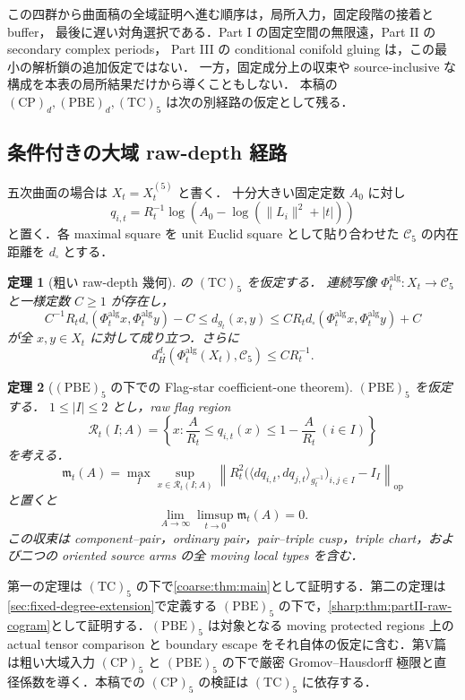 \documentclass[a4paper,11pt]{ltjsarticle}
\numberwithin{equation}{section}
\theoremstyle{plain}
\newtheorem{theorem}{定理}[section]
\theoremstyle{definition}
\theoremstyle{remark}
\newcommand{\Cfive}{\mathcal C_5}\newcommand{\dsq}{d_{\square}}\newcommand{\Lt}{L_t}\newcommand{\Rt}{R_t}
\begin{document}
この四群から曲面稿の全域証明へ進む順序は，局所入力，固定段階の接着と buffer，
最後に遅い対角選択である．Part I の固定空間の無限遠，Part II の secondary complex periods，
Part III の conditional conifold gluing は，この最小の解析鎖の追加仮定ではない．
一方，固定成分上の収束や source-inclusive な構成を本表の局所結果だけから導くこともしない．
本稿の $\mathrm{(CP)}_d,\mathrm{(PBE)}_d,\mathrm{(TC)}_5$ は次の別経路の仮定として残る．

\subsection{条件付きの大域 raw-depth 経路}
五次曲面の場合は $X_t=X_t^{(5)}$ と書く．
十分大きい固定定数 $A_0$ に対し
\[
 q_{i,t}=R_t^{-1}\log\!\left(A_0-\log(\|L_i\|^2+|t|)\right)
\]
と置く．各 maximal square を unit Euclid square として貼り合わせた $\Cfive$ の内在距離を $d_\square$ とする．

\begin{theorem}[粗い raw-depth 幾何]\label{thm:coarse-intro}
 の $\mathrm{(TC)}_5$ を仮定する．
連続写像 $\Phi_t^{\mathrm{alg}}:X_t\to\Cfive$ と一様定数 $C\ge1$ が存在し，
\[
 C^{-1}R_t d_\square(\Phi_t^{\mathrm{alg}}x,\Phi_t^{\mathrm{alg}}y)-C
 \le d_{g_t}(x,y)
 \le CR_t d_\square(\Phi_t^{\mathrm{alg}}x,\Phi_t^{\mathrm{alg}}y)+C
\]
が全 $x,y\in X_t$ に対して成り立つ．さらに
\[
 d_H^{d_\square}(\Phi_t^{\mathrm{alg}}(X_t),\Cfive)\le CR_t^{-1}.
\]
\end{theorem}

\begin{theorem}[$\mathrm{(PBE)}_5$ の下での Flag-star coefficient-one theorem]\label{thm:cogram-intro}
$\mathrm{(PBE)}_5$ を仮定する．
$1\le |I|\le2$ とし，raw flag region
\[
 \mathcal R_t(I;A)=\left\{x:\frac A{R_t}\le q_{i,t}(x)\le1-\frac A{R_t}\ (i\in I)\right\}
\]
を考える．
\[
 \mathfrak m_t(A)=
 \max_I\sup_{x\in\mathcal R_t(I;A)}
 \left\|
 R_t^2\bigl(\langle dq_{i,t},dq_{j,t}\rangle_{g_t^{-1}}\bigr)_{i,j\in I}-I_I
 \right\|_{\mathrm{op}}
\]
と置くと
\[
 \lim_{A\to\infty}\limsup_{t\to0}\mathfrak m_t(A)=0.
\]
この収束は component--pair，ordinary pair，pair--triple cusp，triple chart，および二つの oriented source arms の全 moving local types を含む．
\end{theorem}

第一の定理は $\mathrm{(TC)}_5$ の下で\cref{coarse:thm:main}として証明する．第二の定理は\cref{sec:fixed-degree-extension}で定義する $\mathrm{(PBE)}_5$ の下で，\cref{sharp:thm:partII-raw-cogram}として証明する．$\mathrm{(PBE)}_5$ は対象となる moving protected regions 上の actual tensor comparison と boundary escape をそれ自体の仮定に含む．第V篇は粗い大域入力 $\mathrm{(CP)}_5$ と $\mathrm{(PBE)}_5$ の下で厳密 Gromov--Hausdorff 極限と直径係数を導く．本稿での $\mathrm{(CP)}_5$ の検証は $\mathrm{(TC)}_5$ に依存する．
\end{document}
